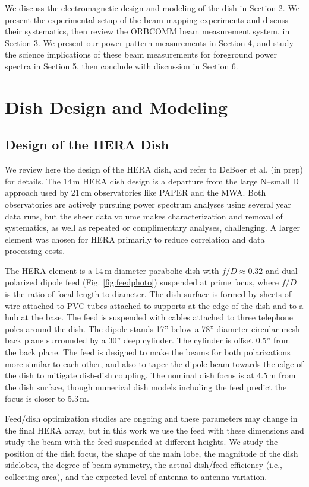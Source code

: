 \documentclass{emulateapj}
\begin{document}
We discuss the electromagnetic design and modeling of the dish in Section 2. We present the 
experimental setup of the beam mapping experiments and discuss their systematics, then 
review the ORBCOMM beam measurement system, in Section 3. We present our power pattern 
measurements in Section 4, and study the science implications of these beam measurements for foreground power spectra in Section 5, then conclude with discussion in Section 6.

\section{Dish Design and Modeling}

\subsection{Design of the HERA Dish}

We review here the design of the HERA dish, and refer to DeBoer et al. (in prep) for details. 
The 14\,m HERA dish design is a departure from the large N--small D approach used by 21\,cm 
observatories like PAPER and the MWA. Both observatories are actively pursuing power 
spectrum analyses using several year data runs, but the sheer data volume makes 
characterization and removal of systematics, as well as repeated or complimentary analyses, 
challenging. A larger element was chosen for HERA primarily to reduce correlation and data processing costs. 

The HERA element is a 14\,m diameter parabolic dish with $f/D\approx0.32$ and dual-polarized dipole feed (Fig. \ref{fig:feedphoto}) suspended at prime focus, where $f/D$ is the ratio of focal length to diameter. The dish surface is formed by sheets of wire attached to PVC tubes attached to supports at the edge of the dish and to a hub at the base. The feed is suspended with cables attached to three telephone poles around the dish. The dipole stands 17'' below a 78'' diameter circular mesh back plane surrounded by a 30'' deep cylinder. The cylinder is offset 0.5'' from the back plane. The feed is designed to make the beams for both polarizations more similar to each other, and also to taper the dipole beam towards the edge of the dish to mitigate dish-dish coupling.  The nominal dish focus is at 4.5\,m from the dish surface, though numerical dish models including the feed predict the focus is closer to 5.3\,m. 

Feed/dish optimization studies are ongoing and these parameters may change in the final HERA array, but in this work we use the feed with these dimensions and study the beam with the feed suspended at different heights. We study the position of the dish focus, the shape of the main lobe, the magnitude of the dish sidelobes, the degree of beam symmetry, the actual dish/feed efficiency (i.e., collecting area), and the expected level of antenna-to-antenna variation.
\end{document}
